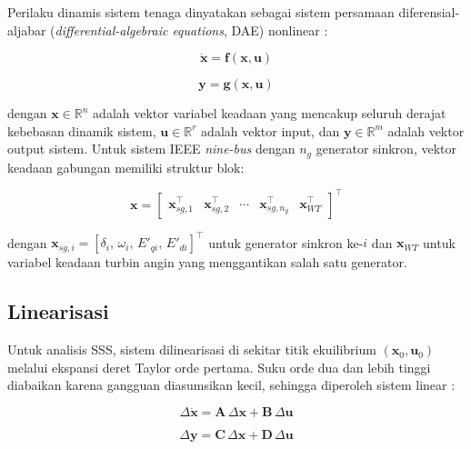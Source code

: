 Perilaku dinamis sistem tenaga dinyatakan sebagai sistem persamaan
diferensial-aljabar (\textit{differential-algebraic equations}, DAE) nonlinear
\cite{sauer2006power}:

\begin{equation}
  \dot{\mathbf{x}} = \mathbf{f}(\mathbf{x}, \mathbf{u})
  \label{eq:ss-nonlinear}
\end{equation}

\begin{equation}
  \mathbf{y} = \mathbf{g}(\mathbf{x}, \mathbf{u})
  \label{eq:output-nonlinear}
\end{equation}

dengan $\mathbf{x} \in \mathbb{R}^n$ adalah vektor variabel keadaan yang mencakup
seluruh derajat kebebasan dinamik sistem, $\mathbf{u} \in \mathbb{R}^r$ adalah vektor
input, dan $\mathbf{y} \in \mathbb{R}^m$ adalah vektor output sistem. Untuk sistem
IEEE \textit{nine-bus} dengan $n_g$ generator sinkron, vektor keadaan gabungan memiliki
struktur blok:

\begin{equation}
  \mathbf{x} =
  \begin{bmatrix}
    \mathbf{x}_{sg,1}^\top & \mathbf{x}_{sg,2}^\top & \cdots &
    \mathbf{x}_{sg,n_g}^\top & \mathbf{x}_{WT}^\top
  \end{bmatrix}^\top
  \label{eq:state-full}
\end{equation}

dengan $\mathbf{x}_{sg,i} = [\delta_i,\,\omega_i,\,E'_{qi},\,E'_{di}]^\top$ untuk
generator sinkron ke-$i$ dan $\mathbf{x}_{WT}$ untuk variabel keadaan turbin angin
yang menggantikan salah satu generator.

\subsection{Linearisasi}

Untuk analisis SSS, sistem dilinearisasi di sekitar titik ekuilibrium
$(\mathbf{x}_0, \mathbf{u}_0)$ melalui ekspansi deret Taylor orde pertama. Suku
orde dua dan lebih tinggi diabaikan karena gangguan diasumsikan kecil, sehingga
diperoleh sistem linear \cite{kundur1994power}:

\begin{equation}
  \Delta\dot{\mathbf{x}} = \mathbf{A}\,\Delta\mathbf{x} + \mathbf{B}\,\Delta\mathbf{u}
  \label{eq:linear-state}
\end{equation}

\begin{equation}
  \Delta\mathbf{y} = \mathbf{C}\,\Delta\mathbf{x} + \mathbf{D}\,\Delta\mathbf{u}
  \label{eq:linear-output}
\end{equation}


